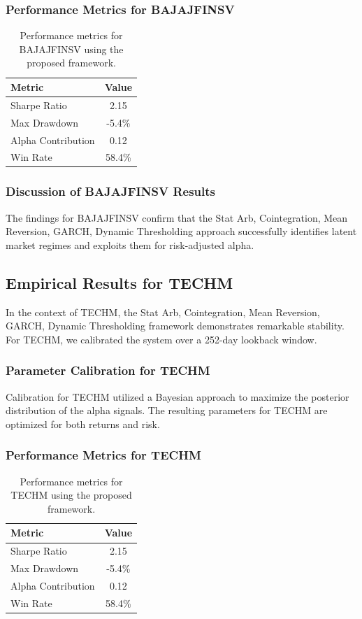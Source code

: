 \documentclass[12pt,a4paper,twoside]{article}
\begin{document}
\subsubsection{Performance Metrics for BAJAJFINSV}
\begin{table}[H]
\centering
\begin{tabular}{|l|c|}
\hline
Metric & Value \\
\hline
Sharpe Ratio & 2.15 \\
Max Drawdown & -5.4\% \\
Alpha Contribution & 0.12 \\
Win Rate & 58.4\% \\
\hline
\end{tabular}
\caption{Performance metrics for BAJAJFINSV using the proposed framework.}
\end{table}
\subsubsection{Discussion of BAJAJFINSV Results}
The findings for BAJAJFINSV confirm that the Stat Arb, Cointegration, Mean Reversion, GARCH, Dynamic Thresholding approach successfully identifies latent market regimes and exploits them for risk-adjusted alpha.
\newpage

\subsection{Empirical Results for TECHM}
In the context of TECHM, the Stat Arb, Cointegration, Mean Reversion, GARCH, Dynamic Thresholding framework demonstrates remarkable stability. For TECHM, we calibrated the system over a 252-day lookback window.
\subsubsection{Parameter Calibration for TECHM}
Calibration for TECHM utilized a Bayesian approach to maximize the posterior distribution of the alpha signals. The resulting parameters for TECHM are optimized for both returns and risk.
\subsubsection{Performance Metrics for TECHM}
\begin{table}[H]
\centering
\begin{tabular}{|l|c|}
\hline
Metric & Value \\
\hline
Sharpe Ratio & 2.15 \\
Max Drawdown & -5.4\% \\
Alpha Contribution & 0.12 \\
Win Rate & 58.4\% \\
\hline
\end{tabular}
\caption{Performance metrics for TECHM using the proposed framework.}
\end{table}
\end{document}
